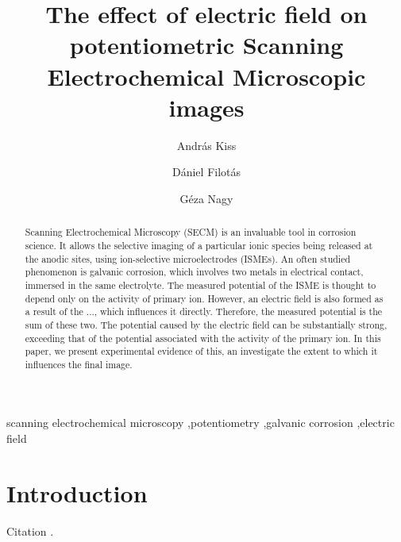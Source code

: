 \documentclass[3p]{elsarticle}
\begin{document}
\begin{frontmatter}

\title{The effect of electric field on potentiometric Scanning Electrochemical Microscopic images}
\author[akiss]{András Kiss}
\address[akiss, gnagy]{Department of General and Physical Chemistry, Faculty of Sciences, University of Pécs, 7624 Pécs, Ifjúság útja 6, Hungary}
\author[dfilotas]{Dániel Filotás}
\author[gnagy]{Géza Nagy}


\begin{abstract}
Scanning Electrochemical Microscopy (SECM) is an invaluable tool in corrosion science. It allows the selective imaging of a particular ionic species being released at the anodic sites, using ion-selective microelectrodes (ISMEs). An often studied phenomenon is galvanic corrosion, which involves two metals in electrical contact, immersed in the same electrolyte. The measured potential of the ISME is thought to depend only on the activity of primary ion. However, an electric field is also formed as a result of the ..., which influences it directly. Therefore, the measured potential is the sum of these two. The potential caused by the electric field can be substantially strong, exceeding that of the potential associated with the activity of the primary ion. In this paper, we present experimental evidence of this, an investigate the extent to which it influences the final image. 
\end{abstract}
\begin{keyword}
	scanning electrochemical microscopy \sep potentiometry \sep galvanic corrosion \sep electric field
\end{keyword}
\end{frontmatter}

\section{Introduction}
Citation \cite{artefacts}.
\end{document}
